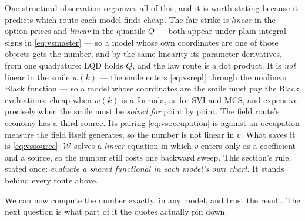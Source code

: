 One structural observation organizes all of this, and it is worth
stating because it predicts which route each model finds cheap.  The
fair strike is \emph{linear} in the option prices and \emph{linear}
in the quantile $Q$ --- both appear under plain integral signs in
\eqref{eq:vsmaster} --- so a model whose own coordinates are one of
those objects gets the number, and by the same linearity its
parameter derivatives, from one quadrature: LQD holds
$Q$, and the law route is a dot product.  It is \emph{not} linear in
the smile $w(k)$ --- the smile enters \eqref{eq:vsrepl} through the
nonlinear Black function --- so a model whose coordinates are the
smile must pay the Black evaluations: cheap when $w(k)$ is a formula,
as for SVI and MCS, and expensive precisely when the smile must be
\emph{solved for} point by point.  The field route's economy has a
third source.  Its pairing \eqref{eq:vsoccupation} is against an
occupation measure the field itself generates, so the number is not
linear in $v$.  What saves it is \eqref{eq:vssource}:
$\mathcal{W}$ solves a \emph{linear} equation in which $v$ enters
only as a coefficient and a source, so the number still costs one
backward sweep.  This section's rule, stated once: \emph{evaluate a
shared functional in each model's own chart}.  It stands behind
every route above.

We can now compute the number exactly, in any model, and trust the
result.  The next question is what part of it the quotes actually pin
down.
